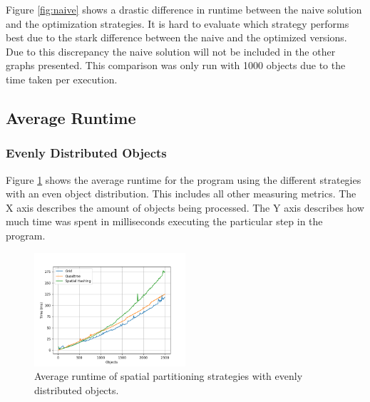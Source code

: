 \documentclass[a4paper, 12pt]{article}
\begin{document}
Figure \ref{fig:naive} shows a drastic difference in runtime between the naive
solution and the optimization strategies. It is hard to evaluate which strategy
performs best due to the stark difference between the naive and the optimized
versions. Due to this discrepancy the naive solution will not be included in the
other graphs presented. This comparison was only run with 1000 objects due to
the time taken per execution.

\subsection{Average Runtime}

\subsubsection{Evenly Distributed Objects}
Figure \ref{fig:even-average} shows the average runtime for the program
using the different strategies with an even object distribution. This includes
all other measuring metrics. The X axis describes the amount of objects being
processed. The Y axis describes how much time was spent in milliseconds
executing the particular step in the program.

\begin{figure}[h]
    \centering
    \includegraphics[width=0.5\textwidth]{even-average.png}
    \caption{Average runtime of spatial partitioning strategies with evenly
    distributed objects.}
    \label{fig:even-average}
\end{figure}
\end{document}
